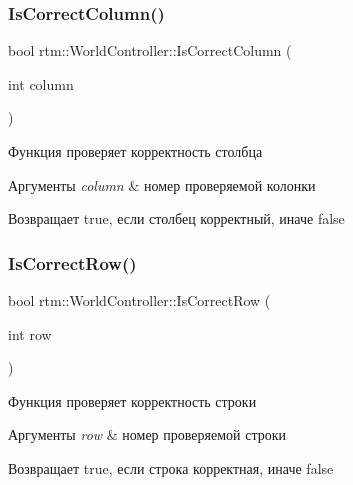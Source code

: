 \subsubsection{\texorpdfstring{Is\+Correct\+Column()}{IsCorrectColumn()}}
{\footnotesize\ttfamily bool rtm\+::\+World\+Controller\+::\+Is\+Correct\+Column (\begin{DoxyParamCaption}\item[{int}]{column }\end{DoxyParamCaption})}



Функция проверяет корректность столбца 


\begin{DoxyParams}{Аргументы}
{\em column} & номер проверяемой колонки \\
\hline
\end{DoxyParams}
\begin{DoxyReturn}{Возвращает}
true, если столбец корректный, иначе false 
\end{DoxyReturn}
\mbox{\label{classrtm_1_1_world_controller_ae468c9d0d4de9c4250eea4c78dc9eb7a}} 
\subsubsection{\texorpdfstring{Is\+Correct\+Row()}{IsCorrectRow()}}
{\footnotesize\ttfamily bool rtm\+::\+World\+Controller\+::\+Is\+Correct\+Row (\begin{DoxyParamCaption}\item[{int}]{row }\end{DoxyParamCaption})}



Функция проверяет корректность строки 


\begin{DoxyParams}{Аргументы}
{\em row} & номер проверяемой строки \\
\hline
\end{DoxyParams}
\begin{DoxyReturn}{Возвращает}
true, если строка корректная, иначе false 
\end{DoxyReturn}
\mbox{\label{classrtm_1_1_world_controller_aae96f9a5d1a32b4c347fa07a6180f8fd}} 
